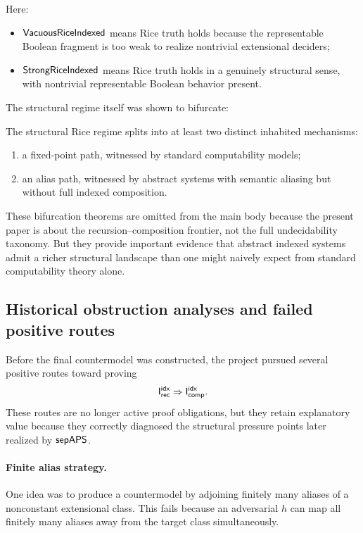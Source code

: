 \documentclass[11pt]{article}
\begin{document}
Here:
\begin{itemize}[leftmargin=2em]
\item \(\mathsf{VacuousRiceIndexed}\) means Rice truth holds because the representable Boolean fragment is too weak to realize nontrivial extensional deciders;
\item \(\mathsf{StrongRiceIndexed}\) means Rice truth holds in a genuinely structural sense, with nontrivial representable Boolean behavior present.
\end{itemize}

The structural regime itself was shown to bifurcate:

\begin{theorem}\label{thm:app-strong-rice-bif}
The structural Rice regime splits into at least two distinct inhabited mechanisms:
\begin{enumerate}[label=(\roman*),leftmargin=2em]
\item a fixed-point path, witnessed by standard computability models;
\item an alias path, witnessed by abstract systems with semantic aliasing but without full indexed composition.
\end{enumerate}
\end{theorem}

\begin{remark}
These bifurcation theorems are omitted from the main body because the present paper is about the recursion--composition frontier, not the full undecidability taxonomy.  But they provide important evidence that abstract indexed systems admit a richer structural landscape than one might naively expect from standard computability theory alone.
\end{remark}

\subsection{Historical obstruction analyses and failed positive routes}\label{app:historical-obstructions}

Before the final countermodel was constructed, the project pursued several positive routes toward proving
\[
\mathsf{I}_{\mathsf{rec}}^{\mathsf{idx}} \Rightarrow \mathsf{I}_{\mathsf{comp}}^{\mathsf{idx}}.
\]
These routes are no longer active proof obligations, but they retain explanatory value because they correctly diagnosed the structural pressure points later realized by \(\mathsf{sepAPS}\).

\paragraph{Finite alias strategy.}
One idea was to produce a countermodel by adjoining finitely many aliases of a nonconstant extensional class.  This fails because an adversarial \(h\) can map all finitely many aliases away from the target class simultaneously.
\end{document}
